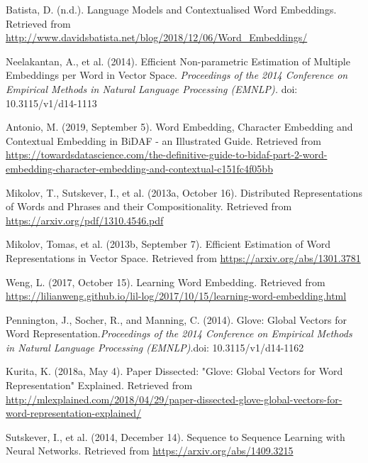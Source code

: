 \begin{enumerateSpaced}{4pt}
    \item Batista, D. (n.d.). Language Models and Contextualised Word Embeddings. Retrieved from \url{http://www.davidsbatista.net/blog/2018/12/06/Word_Embeddings/}
    
    \item Neelakantan, A., et al. (2014). Efficient Non-parametric Estimation of Multiple Embeddings per Word in Vector Space. \emph{Proceedings of the 2014 Conference on Empirical Methods in Natural Language Processing (EMNLP).} doi: 10.3115/v1/d14-1113
    
    \item Antonio, M. (2019, September 5). Word Embedding, Character Embedding and Contextual Embedding in BiDAF - an Illustrated Guide. Retrieved from \url{https://towardsdatascience.com/the-definitive-guide-to-bidaf-part-2-word-embedding-character-embedding-and-contextual-c151fc4f05bb}
    
    \item Mikolov, T., Sutskever, I., et al. (2013a, October 16). Distributed Representations of Words and Phrases and their Compositionality. Retrieved from \url{https://arxiv.org/pdf/1310.4546.pdf}
    
    \item Mikolov, Tomas, et al. (2013b, September 7). Efficient Estimation of Word Representations in Vector Space. Retrieved from \url{https://arxiv.org/abs/1301.3781}
    
    \item Weng, L. (2017, October 15). Learning Word Embedding. Retrieved from \url{https://lilianweng.github.io/lil-log/2017/10/15/learning-word-embedding.html}


    \item Pennington, J., Socher, R., and Manning, C. (2014). Glove: Global Vectors for Word Representation.\emph{Proceedings of the 2014 Conference on Empirical Methods in Natural Language Processing (EMNLP)}.doi: 10.3115/v1/d14-1162

    
    \item Kurita, K. (2018a, May 4). Paper Dissected: "Glove: Global Vectors for Word Representation" Explained. Retrieved from \url{http://mlexplained.com/2018/04/29/paper-dissected-glove-global-vectors-for-word-representation-explained/}
    
    \item Sutskever, I., et al. (2014, December 14). Sequence to Sequence Learning with Neural Networks. Retrieved from \url{https://arxiv.org/abs/1409.3215}
    

\end{enumerateSpaced}

